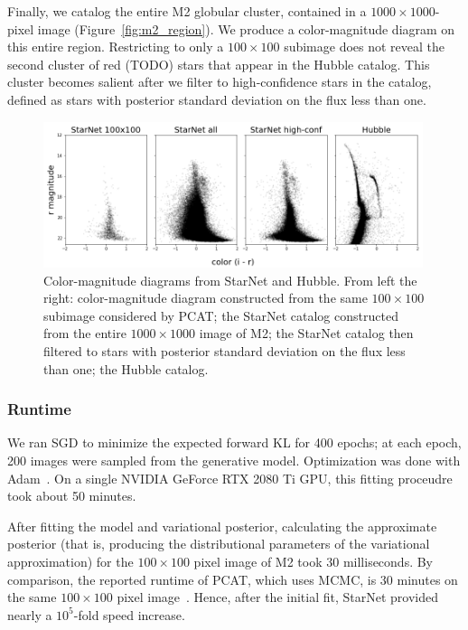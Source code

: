 Finally, we catalog the entire M2 globular cluster, 
contained in a $1000 \times 1000$-pixel image (Figure~\ref{fig:m2_region}). We produce a color-magnitude diagram on this entire region. 
Restricting to only a $100\times100$ subimage 
does not reveal the second cluster of red (TODO)
stars that appear in the Hubble catalog. 
This cluster becomes salient after we filter to
high-confidence stars in the catalog, defined as stars with posterior standard deviation on the flux less than one. 

\begin{figure}[tb]
    \centering
    \includegraphics[width=0.99\textwidth]{figures/m2_results/m2_cmd.png}
    \vspace{-0.5cm}
    \caption{Color-magnitude diagrams from StarNet and Hubble. From left the right: color-magnitude diagram constructed from the same $100\times100$ subimage considered by PCAT; 
    the StarNet catalog constructed from the entire $1000 \times 1000$ image of M2; 
    the StarNet catalog then filtered to stars with posterior standard deviation on the flux less than one; the Hubble catalog. 
}
    \label{fig:m2_cmd}
\end{figure}

\subsubsection{Runtime}
\label{sec:runtime}
We ran SGD to minimize the expected forward KL
for 400 epochs; at each epoch, 200 images were sampled from the generative model.
Optimization was done with Adam~\citep{kingma2014adam}.
On a single NVIDIA GeForce RTX 2080 Ti GPU,
this fitting proceudre took about 50 minutes.

After fitting the model and variational posterior,
calculating the approximate posterior
(that is, producing the distributional parameters of the variational approximation) for the $100 \times 100$ pixel image of M2 took $30$ milliseconds.
By comparison, the reported runtime of PCAT, which uses MCMC, is 30 minutes on the same $100 \times 100$ pixel image~\citep{Feder_2019}.
Hence, after the initial fit, StarNet provided nearly a $10^5$-fold speed increase.


